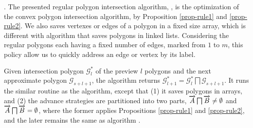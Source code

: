 .
The presented regular polygon intersection algorithm, \ie \rpia, is the optimization of the convex polygon intersection algorithm, by Proposition \ref{prop-rule1} and \ref{prop-rule2}. We also saves vertexes or edges of a polygon in a fixed size array, which is different with algorithm \cpia  that saves polygons in linked lists.
Considering the regular polygons each having a fixed number of edges, marked from $1$ to $m$, this policy allow us to quickly address an edge or vertex by its label.

Given intersection polygon $\mathcal{G}^*_{l}$ of the preview $l$ polygons and the next approximate polygon $\mathcal{G}_{s+l+1}$, the algorithm \rpia returns $\mathcal{G}^*_{l+1} = \mathcal{G}^*_{l}  \bigsqcap \mathcal{G}_{s+l+1}$.
It runs the similar routine as the \cpia algorithm, except that (1) it saves polygons in arrays, and (2) the advance strategies are partitioned into two parts, \ie $\protect\overrightarrow{A} \bigsqcap \protect\overrightarrow{B} \ne \emptyset$ and $\protect\overrightarrow{A} \bigsqcap \protect\overrightarrow{B} = \emptyset$, where the former applies Propositions \ref{prop-rule1} and \ref{prop-rule2}, and the later remains the same as algorithm \cpia.





